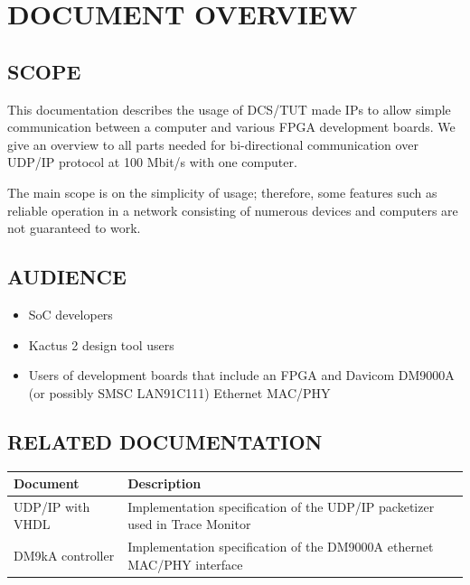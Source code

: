 \documentclass[a4paper,10pt,oneside,final]{article}
\def\deftablecolora{blue!10!white}
\def\deftablecolorb{white}
\begin{document}
\newpage
\section{DOCUMENT OVERVIEW}

\subsection{SCOPE}

This documentation describes the usage of DCS/TUT made IPs to 
allow simple communication between a computer and various FPGA
development boards. We give an overview to all parts needed for
bi-directional communication over UDP/IP protocol at 100 Mbit/s
with one computer.

The main scope is on the simplicity of usage; therefore, some
features such as reliable operation in a network consisting of
numerous devices and computers are not guaranteed to work.

\subsection{AUDIENCE}

\begin{itemize}
\item SoC developers
\item Kactus 2 design tool users
\item Users of development boards that include an FPGA and Davicom DM9000A (or possibly SMSC LAN91C111) Ethernet MAC/PHY
\end{itemize}

\subsection{RELATED DOCUMENTATION}

\begin{center}
  \rowcolors[]{2}{\deftablecolora}{\deftablecolorb}

  \begin{tabularx}{\textwidth}{ | p{8cm} | X | }    %
    \hline
    Document & Description\\
    \hline    
    UDP/IP with VHDL & Implementation specification of the UDP/IP packetizer used in Trace Monitor \\
    DM9kA controller & Implementation specification of the DM9000A ethernet MAC/PHY interface \\
    \hline
  \end{tabularx}
\end{center}
\end{document}
